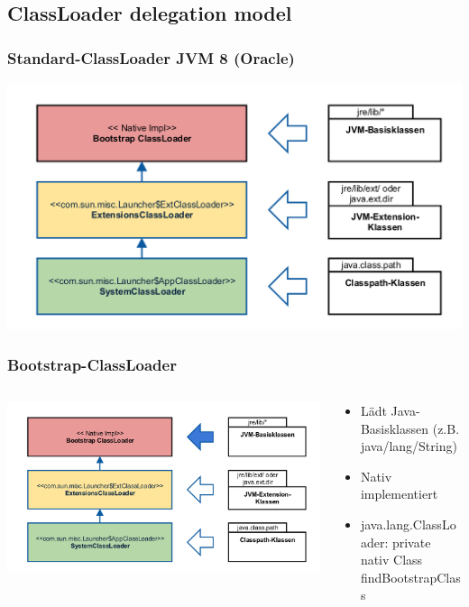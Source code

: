 \documentclass[aspectratio=169]{beamer}
\begin{document}
\subsection{ClassLoader delegation model}

\begin{frame}
	\frametitle{Standard-ClassLoader JVM 8 (Oracle)}
	\includegraphics[scale=0.1]{assets/classloader-hierachie.png} 
\end{frame}

\begin{frame}
	\frametitle{Bootstrap-ClassLoader}
	\begin{columns}[T] 
	\begin{column}{.46\textwidth}
		\includegraphics[scale=0.06]{assets/classloader-hierachie-bootstrap-active.png} 
	\end{column}
	\hfill
	\begin{column}{.56\textwidth}

	\begin{itemize}
		\item{Lädt Java-Basisklassen (z.B. java/lang/String)}
		\item{Nativ implementiert}
		\item{java.lang.ClassLoader: private nativ Class findBootstrapClass}
	\end{itemize}

	\end{column}
	\end{columns}
\end{frame}
\end{document}
